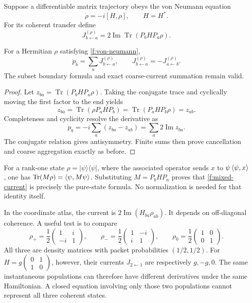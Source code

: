 Suppose a differentiable matrix trajectory obeys the von Neumann equation
\begin{equation}\label{f:von-neumann}
 \dot\rho=-i[H,\rho],\qquad H=H^*.
\end{equation}
For its coherent transfer define
\begin{equation}\label{f:mixed-current}
 J^{(\rho)}_{b\leftarrow a}
 =2\operatorname{Im}\operatorname{Tr}(P_bHP_a\rho).
\end{equation}

\begin{proposition}\label{f:mixed-theorem}
For a Hermitian $\rho$ satisfying \eqref{f:von-neumann},
\[
 \dot p_b=\sum_aJ^{(\rho)}_{b\leftarrow a},\qquad
 J^{(\rho)}_{b\leftarrow a}=-J^{(\rho)}_{a\leftarrow b}.
\]
The subset boundary formula and exact coarse-current summation remain valid.
\end{proposition}

\begin{proof}
Let $z_{ba}=\operatorname{Tr}(P_bHP_a\rho)$. Taking the conjugate trace and cyclically moving the first factor to the end yields
\[
 \overline{z_{ba}}=\operatorname{Tr}(\rho P_aHP_b)
 =\operatorname{Tr}(P_aHP_b\rho)=z_{ab}.
\]
Completeness and cyclicity resolve the derivative as
\[
 \dot p_b=-i\sum_a(z_{ba}-z_{ab})
 =\sum_a2\operatorname{Im}z_{ba}.
\]
The conjugate relation gives antisymmetry. Finite sums then prove cancellation and coarse aggregation exactly as before.
\end{proof}

For a rank-one state $\rho=|\psi\rangle\langle\psi|$, where the associated operator sends $x$ to $\psi\left\langle\psi,x\right\rangle$, one has
$\operatorname{Tr}(M\rho)=\left\langle\psi,M\psi\right\rangle$. Substituting $M=P_bHP_a$ proves that \eqref{f:mixed-current} is precisely the pure-state formula. No normalization is needed for that identity itself.

In the coordinate atlas, the current is $2\operatorname{Im}(H_{ba}\rho_{ab})$. It depends on off-diagonal coherence. A useful test is to compare
\[
 \rho_+=\frac12\begin{pmatrix}1&i\\-i&1\end{pmatrix},\qquad
 \rho_-=\frac12\begin{pmatrix}1&-i\\i&1\end{pmatrix},\qquad
 \rho_0=\frac12\begin{pmatrix}1&0\\0&1\end{pmatrix}.
\]
All three are density matrices with packet probabilities $(1/2,1/2)$. For $H=g\left(\begin{smallmatrix}0&1\\1&0\end{smallmatrix}\right)$, however, their currents $J_{2\leftarrow1}$ are respectively $g,-g,0$. The same instantaneous populations can therefore have different derivatives under the same Hamiltonian. A closed equation involving only those two populations cannot represent all three coherent states.


